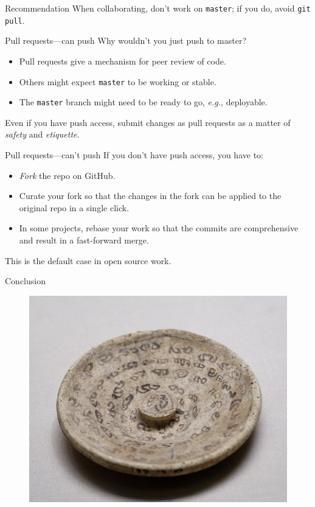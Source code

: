 \begin{frame}{Recommendation}
  \huge {
  When collaborating, don't work on \texttt{master}; if you do,
  avoid \texttt{git pull}.
}
\end{frame}

\begin{frame}{Pull requests---can push}
  Why wouldn't you just push to master?

  \begin{itemize}
    \item Pull requests give a mechanism for peer review of code.
    \item Others might expect \texttt{master} to be working or stable.
    \item The \texttt{master} branch might need to be ready to
          go, \emph{e.g.}, deployable.
  \end{itemize}

  Even if you have push access, submit changes as pull requests as a
  matter of \emph{safety} and \emph{etiquette}.
\end{frame}

\begin{frame}{Pull requests---can't push}
  If you don't have push access, you have to:

  \begin{itemize}
    \item \emph{Fork} the repo on GitHub.
    \item Curate your fork so that the changes in the fork can be
          applied to the original repo in a single click.
    \item In some projects, rebase your work so that the commits are
          comprehensive and result in a fast-forward merge.
  \end{itemize}

  This is the default case in open source work.
\end{frame}

\begin{frame}{Conclusion}
  \begin{figure}
    \includegraphics[scale=0.82]{magic_lid.jpg}
  \end{figure}
\end{frame}



